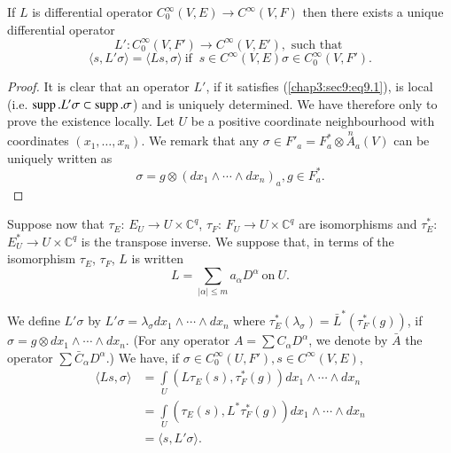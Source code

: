 \setcounter{lemma}{0}
\begin{lemma}\label{chap3:sec9:lem1}  %
  If $L$ is differential operator $C^\infty_0 (V, E) \to C^\infty (V,
  F)$ then there exists a unique differential operator 
  $$
  L' : C^\infty_0 (V, F') \to C^\infty (V, E'), \text{ such that }
  $$
  \begin{equation}
    \langle s, L' \sigma \rangle = \langle Ls, \sigma \rangle ~ \text{
      if }~ s \in C^\infty (V, E) \sigma \in C^\infty_0 (V,
    F'). \tag{9.1}\label{chap3:sec9:eq9.1}    
  \end{equation}
\end{lemma}

\begin{proof}
  It is clear that an operator $L'$, if it satisfies
  (\ref{chap3:sec9:eq9.1}), is local 
  (i.e. $\operatorname{supp}. L' \sigma \subset \operatorname{supp}. \sigma$) and is uniquely
  determined. We have therefore only to prove the existence
  locally. Let $U$ be a positive coordinate neighbourhood with
  coordinates $(x_1, \ldots , x_n)$. We remark that any $\sigma \in F'
  _a = F^*_a \otimes \overset{n}{A}_a (V)$ can be uniquely written as  
  $$
  \sigma = g \otimes (dx_1 \wedge \cdots \wedge dx_n)_a, g \in F^*_a.
  $$
\end{proof}

Suppose now that $\tau_E$: $E_U \to U \times \mathbb{C}^q$, $\tau _F$:
$F_U \to U \times \mathbb{C}^q$ are isomorphisms and $\tau^*_E$: $E^*_U
\to U \times \mathbb{C}^q$ is the transpose inverse. We suppose that,
in terms of the isomorphism $\tau_E$, $\tau_F$, $L$ is written  
$$
L = \sum_{|\alpha | \leq m} a_{\alpha} D^{\alpha} ~\text{on}~ U.
$$

We define $L' \sigma$  by $L' \sigma = \lambda_{\sigma} dx_1 \wedge
\cdots \wedge dx_n$ where $\tau^*_E (\lambda_{\sigma}) = \bar{L}^*
(\tau^*_F (g))$, if $\sigma = g \otimes dx_1 \wedge \cdots \wedge
dx_n$. (For any operator $A = \sum C_{\alpha} D^{\alpha}$, we denote
by $\bar{A}$ the operator $\sum \bar{C}_{\alpha} D^\alpha$.) We have, if
$\sigma \in C^\infty_0 (U, F'), s \in C^\infty (V, E)$, 
\begin{align*}
  \langle Ls, \sigma \rangle  & = \int\limits_U (L \tau_E (s),
  \tau^*_F (g)) dx_1 \wedge \cdots \wedge dx_n\\ 
  & = \int\limits_U ( \tau_E (s), L^* \tau^*_F (g)) dx_1 \wedge \cdots
  \wedge dx_n\\ 
  & = \langle s, L' \sigma \rangle .
\end{align*}

